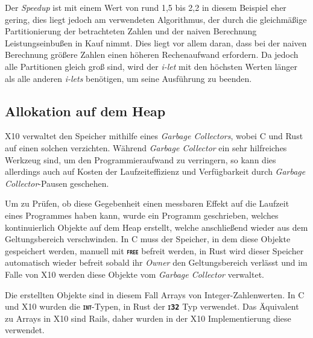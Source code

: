Der \textit{Speedup} ist mit einem Wert von rund 1,5 bis 2,2 in diesem Beispiel eher gering,
dies liegt jedoch am verwendeten Algorithmus,
der durch die gleichmäßige Partitionierung der betrachteten Zahlen und der naiven Berechnung
Leistungseinbußen in Kauf nimmt. Dies liegt vor allem daran, dass bei der naiven Berechnung größere Zahlen
einen höheren Rechenaufwand erfordern. Da jedoch alle Partitionen gleich groß sind, wird der \textit{i-let} mit
den höchsten Werten länger als alle anderen \textit{i-lets} benötigen, um seine Ausführung zu beenden.

\FloatBarrier

\subsection{Allokation auf dem Heap}

X10 verwaltet den Speicher mithilfe eines \textit{Garbage Collectors}, wobei C und Rust auf einen solchen verzichten.
Während \textit{Garbage Collector} ein sehr hilfreiches Werkzeug sind,
um den Programmieraufwand zu verringern, so kann dies
allerdings auch auf Kosten der Laufzeiteffizienz und Verfügbarkeit durch \textit{Garbage Collector}-Pausen geschehen.

Um zu Prüfen, ob diese Gegebenheit einen messbaren Effekt auf die Laufzeit eines Programmes haben kann,
wurde ein Programm geschrieben, welches kontinuierlich Objekte auf dem Heap erstellt,
welche anschließend wieder aus dem Geltungsbereich verschwinden.
In C muss der Speicher, in dem diese Objekte gespeichert werden, manuell mit \texttt{\textsc{\textbf{free}}}
befreit werden, in Rust wird dieser Speicher automatisch wieder befreit sobald ihr \textit{Owner} den
Geltungsbereich verlässt und im Falle von X10 werden diese Objekte vom \textit{Garbage Collector} verwaltet.

Die erstellten Objekte sind in diesem Fall Arrays von Integer-Zahlenwerten. In C und X10 wurden die
\texttt{\textsc{\textbf{int}}}-Typen, in Rust der \texttt{\textsc{\textbf{i32}}} Typ verwendet. 
Das Äquivalent zu Arrays in X10 sind Rails, daher wurden in der X10 Implementierung diese verwendet.

